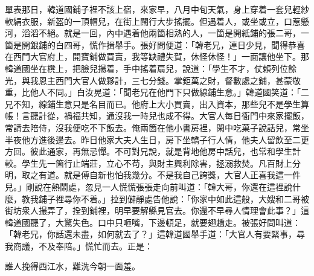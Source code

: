 單表那日，韓道國鋪子裡不該上宿，來家早，八月中旬天氣，身上穿着一套兒輕紗軟絹衣服，新盔的一頂帽兒，在街上闊行大步搖擺。但遇着人，或坐或立，口惹懸河，滔滔不絕。就是一回，內中遇着他兩箇相熟的人，一箇是開紙鋪的張二哥，一箇是開銀鋪的白四哥，慌作揖舉手。張好問便道：「韓老兄，連日少見，聞得恭喜在西門大官府上，開寶鋪做買賣，我等缺禮失賀，休怪休怪！」一面讓他坐下。那韓道國坐在櫈上，把臉兒揚着，手中搖着扇兒，說道：「學生不才，仗賴列位餘光，與我恩主西門大官人做夥計，三七分錢。掌鉅萬之財，督數處之鋪，甚蒙敬重，比他人不同。」白汝晃道：「聞老兄在他門下只做線鋪生意。」韓道國笑道：「二兄不知，線鋪生意只是名目而已。他府上大小買賣，出入資本，那些兒不是學生算帳！言聽計從，禍福共知，通沒我一時兒也成不得。大官人每日衙門中來家擺飯，常請去陪侍，沒我便吃不下飯去。俺兩箇在他小書房裡，閑中吃菓子說話兒，常坐半夜他方進後邊去。昨日他家大夫人生日，房下坐轎子行人情，他夫人留飲至二更方回。彼此通家，再無忌憚。不可對兄說，就是背地他房中話兒，也常和學生計較。學生先一箇行止端莊，立心不苟，與財主興利除害，拯溺救焚。凡百財上分明，取之有道。就是傅自新也怕我幾分。不是我自己誇獎，大官人正喜我這一件兒。」剛說在熱鬧處，忽見一人慌慌張張走向前叫道：「韓大哥，你還在這裡說什麼，教我鋪子裡尋你不着。」{}拉到僻靜處告他說：「你家中如此這般，大嫂和二哥被街坊衆人撮弄了，拴到鋪裡，明早要解縣見官去。你還不早尋人情理會此事？」這韓道國聽了，大驚失色。口中只咂嘴，下邊頓足，就要翅趫走。被張好問叫道：「韓老兄，你話還未盡，如何就去了？」這韓道國舉手道：「大官人有要緊事，尋我商議，不及奉陪。」慌忙而去。正是：

\begin{myquote} 
誰人挽得西江水，難洗今朝一面羞。
\end{myquote} 

